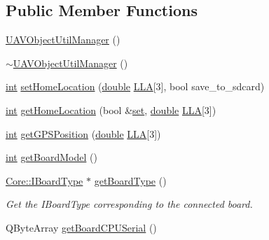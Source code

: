 \subsection*{Public Member Functions}
\begin{DoxyCompactItemize}
\item 
\hyperlink{group___u_a_v_objects_plugin_gaa646568941e8ce857e188b39c90cef6d}{U\-A\-V\-Object\-Util\-Manager} ()
\item 
\hyperlink{group___u_a_v_objects_plugin_gaffdcd54a6b9ce6a7dcf10beb881f71a7}{$\sim$\-U\-A\-V\-Object\-Util\-Manager} ()
\item 
\hyperlink{ioapi_8h_a787fa3cf048117ba7123753c1e74fcd6}{int} \hyperlink{group___u_a_v_objects_plugin_gafcfa22c5812ed36ca7a2d6e442ba1710}{set\-Home\-Location} (\hyperlink{_super_l_u_support_8h_a8956b2b9f49bf918deed98379d159ca7}{double} \hyperlink{_o_p_plots_8m_ac4d07718b2724e836be86fbe0c8c5704}{L\-L\-A}\mbox{[}3\mbox{]}, bool save\-\_\-to\-\_\-sdcard)
\item 
\hyperlink{ioapi_8h_a787fa3cf048117ba7123753c1e74fcd6}{int} \hyperlink{group___u_a_v_objects_plugin_gac5e7b38a473a50f709fb6312ef511e59}{get\-Home\-Location} (bool \&\hyperlink{analyze_raw_8m_a11671e12e7b3fc5881313758d6cc0b45}{set}, \hyperlink{_super_l_u_support_8h_a8956b2b9f49bf918deed98379d159ca7}{double} \hyperlink{_o_p_plots_8m_ac4d07718b2724e836be86fbe0c8c5704}{L\-L\-A}\mbox{[}3\mbox{]})
\item 
\hyperlink{ioapi_8h_a787fa3cf048117ba7123753c1e74fcd6}{int} \hyperlink{group___u_a_v_objects_plugin_gade02e26d0bb8afe69edff8a076882dcd}{get\-G\-P\-S\-Position} (\hyperlink{_super_l_u_support_8h_a8956b2b9f49bf918deed98379d159ca7}{double} \hyperlink{_o_p_plots_8m_ac4d07718b2724e836be86fbe0c8c5704}{L\-L\-A}\mbox{[}3\mbox{]})
\item 
\hyperlink{ioapi_8h_a787fa3cf048117ba7123753c1e74fcd6}{int} \hyperlink{group___u_a_v_object_util_plugin_ga45c8f562def61c9273af2b243d981114}{get\-Board\-Model} ()
\item 
\hyperlink{class_core_1_1_i_board_type}{Core\-::\-I\-Board\-Type} $\ast$ \hyperlink{group___u_a_v_objects_plugin_gac3a1293716fa3eb310ed257ade7f6722}{get\-Board\-Type} ()
\begin{DoxyCompactList}\small\item\em Get the I\-Board\-Type corresponding to the connected board. \end{DoxyCompactList}\item 
Q\-Byte\-Array \hyperlink{group___u_a_v_object_util_plugin_ga11c8171d7e380e699b4edf9b6860a236}{get\-Board\-C\-P\-U\-Serial} ()

\end{DoxyCompactItemize}
